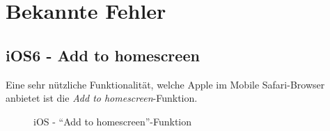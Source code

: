\section{Bekannte Fehler}

\subsection{iOS6 - Add to homescreen}
Eine sehr nützliche Funktionalität, welche Apple im Mobile Safari-Browser anbietet ist die \emph{Add to homescreen}-Funktion.

\begin{figure}[H]
\hfill
{}
\hfill
{}
\hfill
{}
\caption{iOS - "`Add to homescreen"'-Funktion}
\end{figure}

